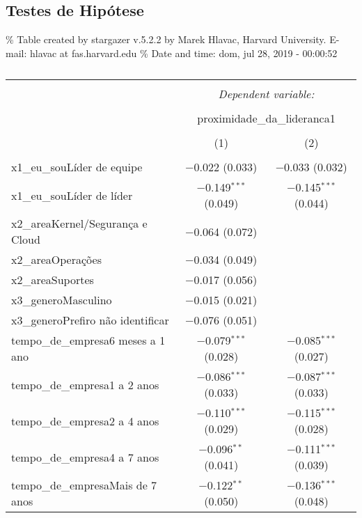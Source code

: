 \documentclass[]{book}
\begin{document}
\pagebreak

\hypertarget{testes-de-hipotese-7}{%
\subsection{Testes de Hipótese}\label{testes-de-hipotese-7}}

\% Table created by stargazer v.5.2.2 by Marek Hlavac, Harvard University. E-mail: hlavac at fas.harvard.edu
\% Date and time: dom, jul 28, 2019 - 00:00:52

\begin{table}[!htbp] \centering 
  \caption{} 
  \label{} 
\begin{tabular}{@{\extracolsep{5pt}}lcc} 
\\[-1.8ex]\hline 
\hline \\[-1.8ex] 
 & \multicolumn{2}{c}{\textit{Dependent variable:}} \\ 
\cline{2-3} 
\\[-1.8ex] & \multicolumn{2}{c}{proximidade\_da\_lideranca1} \\ 
\\[-1.8ex] & (1) & (2)\\ 
\hline \\[-1.8ex] 
 x1\_eu\_souLíder de equipe & $-$0.022 (0.033) & $-$0.033 (0.032) \\ 
  x1\_eu\_souLíder de líder & $-$0.149$^{***}$ (0.049) & $-$0.145$^{***}$ (0.044) \\ 
  x2\_areaKernel/Segurança e Cloud & $-$0.064 (0.072) &  \\ 
  x2\_areaOperações & $-$0.034 (0.049) &  \\ 
  x2\_areaSuportes & $-$0.017 (0.056) &  \\ 
  x3\_generoMasculino & $-$0.015 (0.021) &  \\ 
  x3\_generoPrefiro não identificar & $-$0.076 (0.051) &  \\ 
  tempo\_de\_empresa6 meses a 1 ano & $-$0.079$^{***}$ (0.028) & $-$0.085$^{***}$ (0.027) \\ 
  tempo\_de\_empresa1 a 2 anos & $-$0.086$^{***}$ (0.033) & $-$0.087$^{***}$ (0.033) \\ 
  tempo\_de\_empresa2 a 4 anos & $-$0.110$^{***}$ (0.029) & $-$0.115$^{***}$ (0.028) \\ 
  tempo\_de\_empresa4 a 7 anos & $-$0.096$^{**}$ (0.041) & $-$0.111$^{***}$ (0.039) \\ 
  tempo\_de\_empresaMais de 7 anos & $-$0.122$^{**}$ (0.050) & $-$0.136$^{***}$ (0.048) \\ 

\end{tabular}
\end{table}
\end{document}

